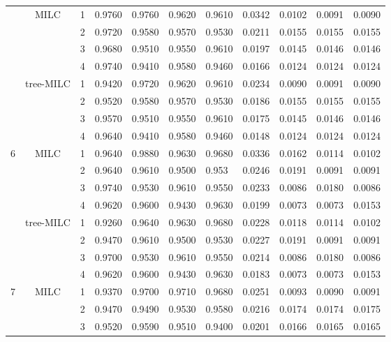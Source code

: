 \documentclass[a4paper, 11pt]{article} %
\begin{document}
\begin{table}[ht]
\begin{tabular}{cc r llll  rrrr }
   & \multirow{4}{*}{MILC}
&  1 
& 0.9760 & 0.9760 & 0.9620 & 0.9610
& 0.0342 & 0.0102 & 0.0091 & 0.0090 \\ 
 && 2 
& 0.9720 & 0.9580 & 0.9570 & 0.9530
 & 0.0211 & 0.0155 & 0.0155 & 0.0155 \\ 
   &&3 
  & 0.9680 & 0.9510 & 0.9550 & 0.9610
 & 0.0197 & 0.0145 & 0.0146 & 0.0146 \\  
  &&4  
 & 0.9740 & 0.9410 & 0.9580 & 0.9460
& 0.0166 & 0.0124 & 0.0124 & 0.0124 \\
\cline{2-11}
   &\multirow{4}{*}{tree-MILC}
&  1 
& 0.9420 & 0.9720 & 0.9620 & 0.9610
& 0.0234 & 0.0090 & 0.0091 & 0.0090 \\ 
 && 2 
& 0.9520 & 0.9580 & 0.9570 & 0.9530
 & 0.0186 & 0.0155 & 0.0155 & 0.0155\\ 
   &&3 
  & 0.9570 & 0.9510 & 0.9550 & 0.9610
 & 0.0175 & 0.0145 & 0.0146 & 0.0146 \\ 
  &&4  
 & 0.9640 & 0.9410 & 0.9580 & 0.9460
 & 0.0148 & 0.0124 & 0.0124 & 0.0124 \\ 
    \hline
    \hline
  \multirow{8}{*}{6}
   & \multirow{4}{*}{MILC}
& 1   & 0.9640 & 0.9880 & 0.9630 & 0.9680  
& 0.0336 & 0.0162 & 0.0114 & 0.0102 \\
  &&2 & 0.9640 & 0.9610 & 0.9500 & 0.953
 & 0.0246 & 0.0191 & 0.0091 & 0.0091 \\ 
  &&3  & 0.9740 & 0.9530 & 0.9610 & 0.9550
 & 0.0233 & 0.0086 & 0.0180 & 0.0086 \\ 
  &&4& 0.9620 & 0.9600 & 0.9430 & 0.9630
 & 0.0199 & 0.0073 & 0.0073 & 0.0153 \\  
 \cline{2-11}
   &\multirow{4}{*}{tree-MILC}
& 1  & 0.9260 & 0.9640 & 0.9630 & 0.9680  
& 0.0228 & 0.0118 & 0.0114 & 0.0102 \\ 
  &&2 & 0.9470 & 0.9610 & 0.9500 & 0.9530
 & 0.0227 & 0.0191 & 0.0091 & 0.0091 \\ 
  &&3  & 0.9700  & 0.9530 & 0.9610 & 0.9550
 & 0.0214 & 0.0086 & 0.0180 & 0.0086 \\ 
  &&4& 0.9620 & 0.9600 & 0.9430 & 0.9630
& 0.0183 & 0.0073 & 0.0073 & 0.0153 \\  
 \hline
    \hline
  \multirow{8}{*}{7}
   & \multirow{4}{*}{MILC}
&  1 
& 0.9370 & 0.9700 & 0.9710 & 0.9680
& 0.0251 & 0.0093 & 0.0090 & 0.0091 \\ 
 && 2 
& 0.9470 & 0.9490 & 0.9530 & 0.9580
 & 0.0216 & 0.0174 & 0.0174 & 0.0175 \\
   &&3 
& 0.9520 & 0.9590 & 0.9510 & 0.9400
 &0.0201 & 0.0166 & 0.0165 & 0.0165 \\ 

\end{tabular}
\end{table}
\end{document}
